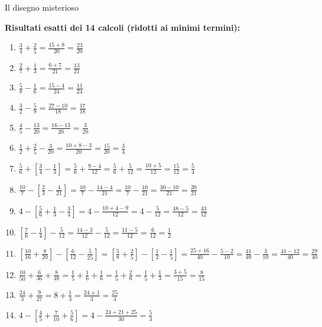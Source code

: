 \begin{esercizio}{Il disegno misterioso}
\begin{soluzione}
  \textbf{Risultati esatti dei 14 calcoli (ridotti ai minimi termini):}
  \begin{enumerate}[label=\arabic*)]
    \item $\frac{3}{4} + \frac{2}{5} = \frac{15+8}{20} = \frac{23}{20}$
    \item $\frac{2}{7} + \frac{1}{3} = \frac{6+7}{21} = \frac{13}{21}$
    \item $\frac{5}{8} - \frac{1}{6} = \frac{15-4}{24} = \frac{11}{24}$
    \item $\frac{3}{2} - \frac{5}{9} = \frac{27-10}{18} = \frac{17}{18}$
    \item $\frac{4}{5} - \frac{13}{20} = \frac{16-13}{20} = \frac{3}{20}$
    \item $\frac{1}{2} + \frac{2}{5} - \frac{3}{20} = \frac{10+8-3}{20} = \frac{15}{20} = \frac{3}{4}$
    \item $\frac{5}{6} + \left[ \frac{3}{4} - \frac{1}{3} \right] = \frac{5}{6} + \frac{9-4}{12} = \frac{5}{6} + \frac{5}{12} = \frac{10+5}{12} = \frac{15}{12} = \frac{5}{4}$
    \item $\frac{10}{7} - \left[ \frac{2}{3} - \frac{4}{21} \right] = \frac{10}{7} - \frac{14-4}{21} = \frac{10}{7} - \frac{10}{21} = \frac{30-10}{21} = \frac{20}{21}$
    \item $4 - \left[ \frac{5}{6} + \frac{1}{3} - \frac{3}{4} \right] = 4 - \frac{10+4-9}{12} = 4 - \frac{5}{12} = \frac{48-5}{12} = \frac{43}{12}$
    \item $\left[ \frac{7}{6} - \frac{1}{4} \right] - \frac{5}{12} = \frac{14-3}{12} - \frac{5}{12} = \frac{11-5}{12} = \frac{6}{12} = \frac{1}{2}$
    \item $\left[ \frac{10}{16} + \frac{8}{20} \right] - \left[ \frac{6}{12} - \frac{5}{25} \right] = \left[ \frac{5}{8} + \frac{2}{5} \right] - \left[ \frac{1}{2} - \frac{1}{5} \right] = \frac{25+16}{40} - \frac{5-2}{10} = \frac{41}{40} - \frac{3}{10} = \frac{41-12}{40} = \frac{29}{40}$
    \item $\frac{10}{50} + \frac{6}{36} + \frac{8}{48} = \frac{1}{5} + \frac{1}{6} + \frac{1}{6} = \frac{1}{5} + \frac{2}{6} = \frac{1}{5} + \frac{1}{3} = \frac{3+5}{15} = \frac{8}{15}$
    \item $\frac{24}{3} + \frac{9}{27} = 8 + \frac{1}{3} = \frac{24+1}{3} = \frac{25}{3}$
    \item $4 - \left[ \frac{4}{5} + \frac{7}{10} + \frac{5}{6} \right] = 4 - \frac{24+21+25}{30} = \frac{5}{3}$
  \end{enumerate}
\end{soluzione}
\end{esercizio}
